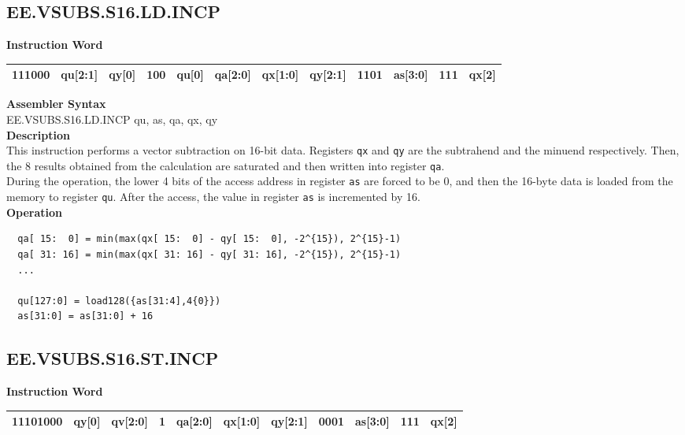 \clearpage
\subsection{EE.VSUBS.S16.LD.INCP}\label{instruction:EEVSUBSS16LDINCP}
\setlength\tabcolsep{6pt}
\textbf{Instruction Word} \\
\begin{tabular}{|c|c|c|c|c|c|c|c|c|c|c|c|}
	\hline
	111000 & qu[2:1] & qy[0] & 100 & qu[0] & qa[2:0] & qx[1:0] & qy[2:1] & 1101 & as[3:0] & 111 & qx[2] \\
	\hline
\end{tabular}

\textbf{Assembler Syntax} \\
EE.VSUBS.S16.LD.INCP qu, as, qa, qx, qy \\
\textbf{Description} \\
This instruction performs a vector subtraction on 16-bit data. Registers \lstinline{qx} and \lstinline{qy} are the subtrahend and the minuend respectively. Then, the 8 results obtained from the calculation are saturated and then written into register \lstinline{qa}. \\ During the operation, the lower 4 bits of the access address in register \lstinline{as} are forced to be 0, and then the 16-byte data is loaded from the memory to register \lstinline{qu}. After the access, the value in register \lstinline{as} is incremented by 16.\\
\textbf{Operation}
\begin{lstlisting}
  qa[ 15:  0] = min(max(qx[ 15:  0] - qy[ 15:  0], -2^{15}), 2^{15}-1)
  qa[ 31: 16] = min(max(qx[ 31: 16] - qy[ 31: 16], -2^{15}), 2^{15}-1)
  ...

  qu[127:0] = load128({as[31:4],4{0}})
  as[31:0] = as[31:0] + 16
\end{lstlisting}

\clearpage
\subsection{EE.VSUBS.S16.ST.INCP}\label{instruction:EEVSUBSS16STINCP}
\setlength\tabcolsep{6pt}
\textbf{Instruction Word} \\
\begin{tabular}{|c|c|c|c|c|c|c|c|c|c|c|}
	\hline
	11101000 & qy[0] & qv[2:0] & 1 & qa[2:0] & qx[1:0] & qy[2:1] & 0001 & as[3:0] & 111 & qx[2] \\
	\hline
\end{tabular}

